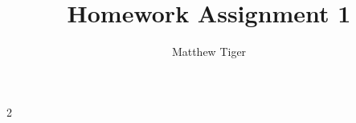 \documentclass[12pt]{article}
\title{Homework Assignment 1}
\author{Matthew Tiger}
\theoremstyle{definition}
\begin{document}
\maketitle







2





\end{document}
